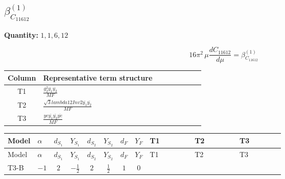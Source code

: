 \documentclass[8pt]{article}
\begin{document}
\begin{landscape}
\section*{$\beta_{C_{11612}}^{(1)}$}
\noindent\textbf{Quantity: }$\mathrm{1,1,6,12}$\par\smallskip
\[16\pi^2\,\mu\frac{d C_{11612}}{d\mu}=\beta_{C_{11612}}^{(1)}\]
\begin{center}
\begin{tabular}{@{}c >{\raggedright\arraybackslash}p{0.82\linewidth}@{}}
\toprule
Column & Representative term structure \\
\midrule
T1 & \(\displaystyle \frac{g_{2}^{2} \overline{y_{1}} \overline{y_{2}}}{MF}\) \\
\midrule
T2 & \(\displaystyle \frac{\sqrt{3} lambda12Inv2 \overline{y_{1}} \overline{y_{2}}}{MF}\) \\
\midrule
T3 & \(\displaystyle \frac{ye \overline{y_{1}} \overline{y_{2}} \overline{ye}}{MF}\) \\
\midrule
\bottomrule
\end{tabular}
\end{center}
\smallskip
\tiny
\begin{longtable}{@{}llcccccc >{\raggedright\arraybackslash}p{0.21\linewidth} >{\raggedright\arraybackslash}p{0.21\linewidth} >{\raggedright\arraybackslash}p{0.21\linewidth}@{}}
\toprule
Model & $\alpha$ & $d_{S_1}$ & $Y_{S_1}$ & $d_{S_2}$ & $Y_{S_2}$ & $d_F$ & $Y_F$ & T1 & T2 & T3 \\
\midrule
\endfirsthead
\toprule
Model & $\alpha$ & $d_{S_1}$ & $Y_{S_1}$ & $d_{S_2}$ & $Y_{S_2}$ & $d_F$ & $Y_F$ & T1 & T2 & T3 \\
\midrule
\endhead
T3-B & $-1$ & $2$ & $-\frac{1}{2}$ & $2$ & $\frac{1}{2}$ & $1$ & $0$ & \scriptsize\adjustbox{max width=\linewidth}{$\begin{gathered} - \frac{3 g_{2}^{2} \overline{y_{1}} \overline{y_{2}}}{4 MF}\end{gathered}$} & \scriptsize\adjustbox{max width=\linewidth}{$\begin{gathered} - \frac{\sqrt{3} lambda12Inv2 \overline{y_{1}} \overline{y_{2}}}{3 MF}\end{gathered}$} & \scriptsize\adjustbox{max width=\linewidth}{$\begin{gathered} \frac{ye \overline{y_{1}} \overline{y_{2}} \overline{ye}}{4 MF}\end{gathered}$} \\
\midrule
\bottomrule
\end{longtable}
\clearpage

\end{landscape}
\end{document}

